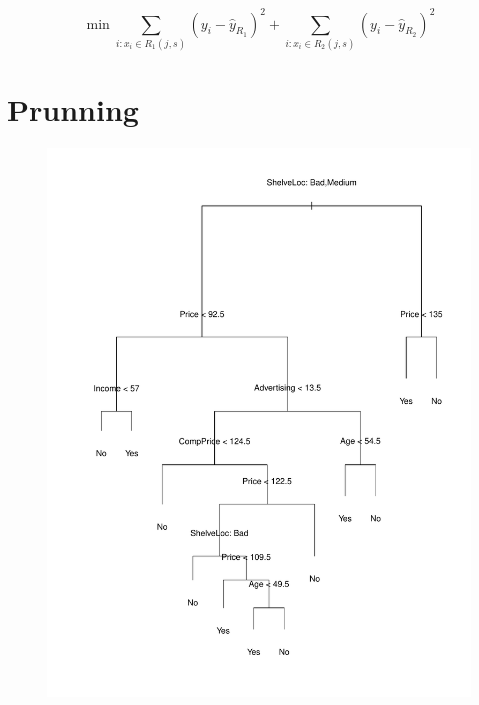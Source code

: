 \documentclass{beamer}
\theoremstyle{definition}
\begin{document}
\begin{frame}
\[ \min \sum_{i\colon x_i \in R_1(j,s)} (y_i - \widehat{y}_{R_1})^2 + \sum_{i\colon x_i \in R_2(j,s)} (y_i - \widehat{y}_{R_2})^2 \]
\end{frame}

\begin{frame}
\begin{figure}[h!]

\end{figure}
\end{frame}


\begin{frame}
\begin{figure}[h!]

\end{figure}
\end{frame}

\section{Prunning}
\begin{frame}
\begin{figure}[h!]
\includegraphics[scale=0.28]{arbolgrande}
\end{figure}
\end{frame}
\end{document}
